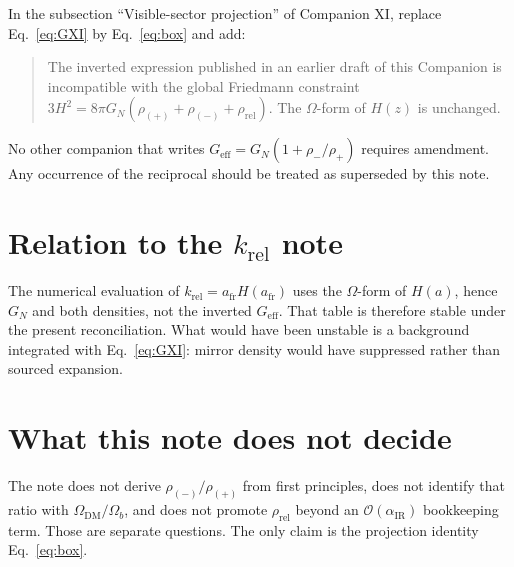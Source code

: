 \documentclass[11pt,a4paper]{article}
\begin{document}
In the subsection ``Visible-sector projection'' of Companion XI, replace
Eq.~\eqref{eq:GXI} by Eq.~\eqref{eq:box} and add:
\begin{quote}
The inverted expression published in an earlier draft of this Companion
is incompatible with the global Friedmann constraint
\(3H^2=8\pi G_N(\rho_{(+)}+\rho_{(-)}+\rho_{\mathrm{rel}})\). The
\(\Omega\)-form of \(H(z)\) is unchanged.
\end{quote}
No other companion that writes \(G_{\mathrm{eff}}=G_N(1+\rho_-/\rho_+)\)
requires amendment. Any occurrence of the reciprocal should be treated as
superseded by this note.

\section{Relation to the \texorpdfstring{\(k_{\mathrm{rel}}\)}{k\_rel} note}

The numerical evaluation of
\(k_{\mathrm{rel}}=a_{\mathrm{fr}}H(a_{\mathrm{fr}})\) uses the
\(\Omega\)-form of \(H(a)\), hence \(G_N\) and both densities, not the
inverted \(G_{\mathrm{eff}}\). That table is therefore stable under the
present reconciliation. What would have been unstable is a background
integrated with Eq.~\eqref{eq:GXI}: mirror density would have suppressed
rather than sourced expansion.

\section{What this note does not decide}

The note does not derive \(\rho_{(-)}/\rho_{(+)}\) from first principles,
does not identify that ratio with \(\Omega_{\mathrm{DM}}/\Omega_b\), and
does not promote \(\rho_{\mathrm{rel}}\) beyond an
\(\mathcal{O}(\alpha_{\mathrm{IR}})\) bookkeeping term. Those are separate
questions. The only claim is the projection identity
Eq.~\eqref{eq:box}.
\end{document}
